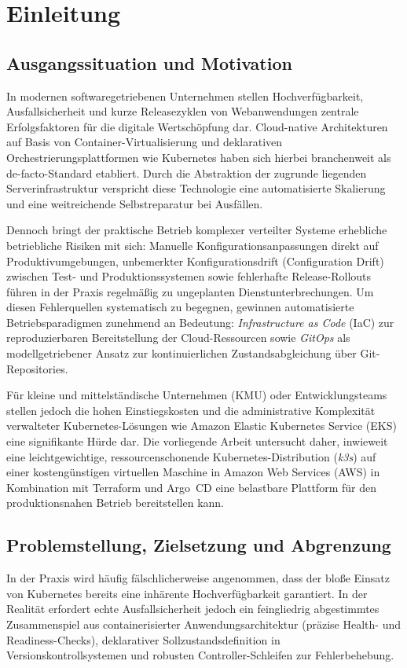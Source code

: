 \chapter{Einleitung}
\label{chap:einleitung}

\section{Ausgangssituation und Motivation}
\label{sec:ausgangssituation-motivation}
In modernen softwaregetriebenen Unternehmen stellen Hochverfügbarkeit, Ausfallsicherheit und kurze Releasezyklen von Webanwendungen zentrale Erfolgsfaktoren für die digitale Wertschöpfung dar. Cloud-native Architekturen auf Basis von Container-Virtualisierung und deklarativen Orchestrierungsplattformen wie Kubernetes haben sich hierbei branchenweit als de-facto-Standard etabliert. Durch die Abstraktion der zugrunde liegenden Serverinfrastruktur verspricht diese Technologie eine automatisierte Skalierung und eine weitreichende Selbstreparatur bei Ausfällen.

Dennoch bringt der praktische Betrieb komplexer verteilter Systeme erhebliche betriebliche Risiken mit sich: Manuelle Konfigurationsanpassungen direkt auf Produktivumgebungen, unbemerkter Konfigurationsdrift (Configuration Drift) zwischen Test- und Produktionssystemen sowie fehlerhafte Release-Rollouts führen in der Praxis regelmäßig zu ungeplanten Dienstunterbrechungen. Um diesen Fehlerquellen systematisch zu begegnen, gewinnen automatisierte Betriebsparadigmen zunehmend an Bedeutung: \textit{Infrastructure as Code} (IaC) zur reproduzierbaren Bereitstellung der Cloud-Ressourcen sowie \textit{GitOps} als modellgetriebener Ansatz zur kontinuierlichen Zustandsabgleichung über Git-Repositories.

Für kleine und mittelständische Unternehmen (KMU) oder Entwicklungsteams stellen jedoch die hohen Einstiegskosten und die administrative Komplexität verwalteter Kubernetes-Lösungen wie Amazon Elastic Kubernetes Service (EKS) eine signifikante Hürde dar. Die vorliegende Arbeit untersucht daher, inwieweit eine leichtgewichtige, ressourcenschonende Kubernetes-Distribution (\textit{k3s}) auf einer kostengünstigen virtuellen Maschine in Amazon Web Services (AWS) in Kombination mit Terraform und Argo~CD eine belastbare Plattform für den produktionsnahen Betrieb bereitstellen kann.

\section{Problemstellung, Zielsetzung und Abgrenzung}
\label{sec:problemstellung-zielsetzung}
In der Praxis wird häufig fälschlicherweise angenommen, dass der bloße Einsatz von Kubernetes bereits eine inhärente Hochverfügbarkeit garantiert. In der Realität erfordert echte Ausfallsicherheit jedoch ein feingliedrig abgestimmtes Zusammenspiel aus containerisierter Anwendungsarchitektur (präzise Health- und Readiness-Checks), deklarativer Sollzustandsdefinition in Versionskontrollsystemen und robusten Controller-Schleifen zur Fehlerbehebung.

